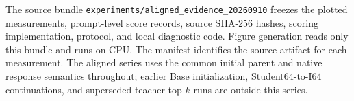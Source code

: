 \begin{table}[t]
\caption{All PG/I64 domain contrasts at the last common capability checkpoints: single-teacher update 500 and joint update 250. Differences are I64 minus PG in percentage points. Intervals are nominal 95\% paired question-bootstrap intervals conditional on the trained checkpoints.}
\label{tab:endpoint_paired}
\centering\small

\end{table}

The source bundle \texttt{experiments/aligned\_evidence\_20260910} freezes the plotted measurements, prompt-level score records, source SHA-256 hashes, scoring implementation, protocol, and local diagnostic code. Figure generation reads only this bundle and runs on CPU. The manifest identifies the source artifact for each measurement. The aligned series uses the common initial parent and native response semantics throughout; earlier Base initialization, Student64-to-I64 continuations, and superseded teacher-top-$k$ runs are outside this series.
